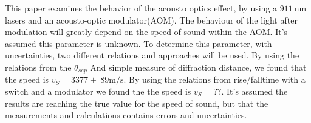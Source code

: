 \documentclass[main]{subfiles}
\begin{document}
This paper examines the behavior of the acousto optics effect, by using a $\SI{911}{\nano\meter}$ lasers and  an acousto-optic modulator(AOM). The behaviour of the light after modulation will greatly depend on the speed of sound within the AOM. It’s assumed this parameter is unknown. To determine this parameter, with uncertainties, two different relations and approaches will be used. By using the relations from the $\theta_{sep}$ And simple measure of diffraction distance, we found that the speed is $v_S = 3377 \pm \ 89 \si{\meter\per\second}$. By using the relations from rise/falltime with a switch and a modulator we found the the speed is $v_S = ??$.
 It’s assumed the results are reaching the true value for the speed of sound, but that the measurements and calculations contains errors and uncertainties.
\end{document}
